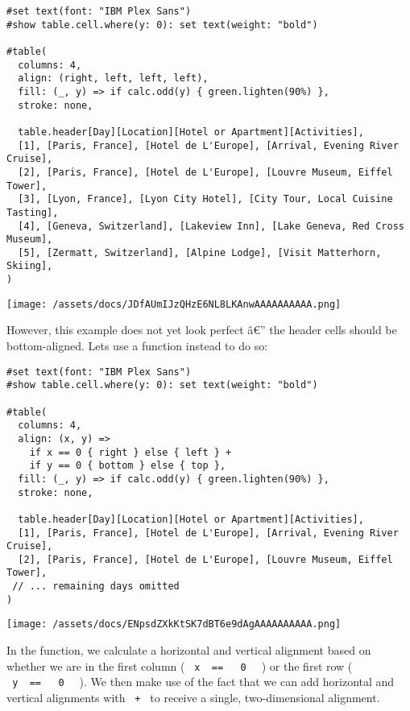 \begin{verbatim}
#set text(font: "IBM Plex Sans")
#show table.cell.where(y: 0): set text(weight: "bold")

#table(
  columns: 4,
  align: (right, left, left, left),
  fill: (_, y) => if calc.odd(y) { green.lighten(90%) },
  stroke: none,

  table.header[Day][Location][Hotel or Apartment][Activities],
  [1], [Paris, France], [Hotel de L'Europe], [Arrival, Evening River Cruise],
  [2], [Paris, France], [Hotel de L'Europe], [Louvre Museum, Eiffel Tower],
  [3], [Lyon, France], [Lyon City Hotel], [City Tour, Local Cuisine Tasting],
  [4], [Geneva, Switzerland], [Lakeview Inn], [Lake Geneva, Red Cross Museum],
  [5], [Zermatt, Switzerland], [Alpine Lodge], [Visit Matterhorn, Skiing],
)
\end{verbatim}

\texttt{[image: /assets/docs/JDfAUmIJzQHzE6NL8LKAnwAAAAAAAAAA.png]}

However, this example does not yet look perfect â€'' the header cells
should be bottom-aligned. Let\textquotesingle s use a function instead
to do so:

\begin{verbatim}
#set text(font: "IBM Plex Sans")
#show table.cell.where(y: 0): set text(weight: "bold")

#table(
  columns: 4,
  align: (x, y) =>
    if x == 0 { right } else { left } +
    if y == 0 { bottom } else { top },
  fill: (_, y) => if calc.odd(y) { green.lighten(90%) },
  stroke: none,

  table.header[Day][Location][Hotel or Apartment][Activities],
  [1], [Paris, France], [Hotel de L'Europe], [Arrival, Evening River Cruise],
  [2], [Paris, France], [Hotel de L'Europe], [Louvre Museum, Eiffel Tower],
 // ... remaining days omitted
)
\end{verbatim}

\texttt{[image: /assets/docs/ENpsdZXkKtSK7dBT6e9dAgAAAAAAAAAA.png]}

In the function, we calculate a horizontal and vertical alignment based
on whether we are in the first column (
\texttt{\ x\ }{\texttt{\ ==\ }}\texttt{\ }{\texttt{\ 0\ }}\texttt{\ } )
or the first row (
\texttt{\ y\ }{\texttt{\ ==\ }}\texttt{\ }{\texttt{\ 0\ }}\texttt{\ } ).
We then make use of the fact that we can add horizontal and vertical
alignments with \texttt{\ +\ } to receive a single, two-dimensional
alignment.

